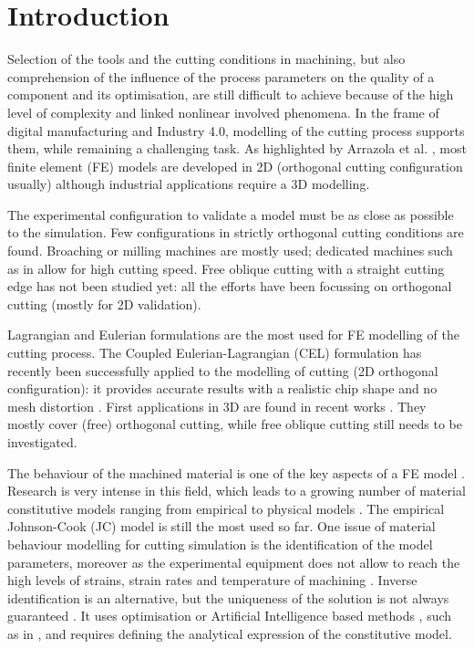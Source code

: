 \documentclass[final,5p,times,twocolumn]{elsarticle}
\begin{document}
\section{Introduction}
\label{Intro}

Selection of the tools and the cutting conditions in machining, but also comprehension of the influence of the process parameters on the quality of a component and its optimisation, are still difficult to achieve because of the high level of complexity and linked nonlinear involved phenomena. In the frame of digital manufacturing and Industry 4.0, modelling of the cutting process supports them, while remaining a challenging task. As highlighted by Arrazola et al. \cite{arrazola_recent_2013}, most finite element (FE) models are developed in 2D (orthogonal cutting configuration usually) although industrial applications require a 3D modelling.

The experimental configuration to validate a model must be as close as possible to the simulation. Few configurations in strictly orthogonal cutting conditions are found. Broaching \cite{abouridouane_friction_2021} or milling \cite{sela_measurement_2021, ducobu_experimental_2015} machines are mostly used; dedicated machines such as in \cite{afrasiabi_numerical-experimental_2021} allow for high cutting speed. Free oblique cutting with a straight cutting edge has not been studied yet: all the efforts have been focussing on orthogonal cutting (mostly for 2D validation).

Lagrangian and Eulerian formulations are the most used for FE modelling of the cutting process. The Coupled Eulerian-Lagrangian (CEL) formulation has recently been successfully applied to the modelling of cutting (2D orthogonal configuration): it provides accurate results with a realistic chip shape and no mesh distortion \cite{ducobu_application_2016}. First applications in 3D are found in recent works \cite{xu_simulation_2021, ducobu_finite_2017, ambrosio_new_2022, vovk_finite_2020, hardt_three_2021}. They mostly cover (free) orthogonal cutting, while free oblique cutting still needs to be investigated.

The behaviour of the machined material is one of the key aspects of a FE model \cite{arrazola_recent_2013, melkote_advances_2017}. Research is very intense in this field, which leads to a growing number of material constitutive models ranging from empirical to physical models \cite{melkote_advances_2017}. The empirical Johnson-Cook (JC) model \cite{johnson_constitutive_1983} is still the most used so far. One issue of material behaviour modelling for cutting simulation is the identification of the model parameters, moreover as the experimental equipment does not allow to reach the high levels of strains, strain rates and temperature of machining \cite{melkote_advances_2017}. Inverse identification is an alternative, but the uniqueness of the solution is not always guaranteed \cite{arrazola_recent_2013}. It uses optimisation or Artificial Intelligence based methods \cite{melkote_advances_2017}, such as in \cite{hardt_investigations_2021}, and requires defining the analytical expression of the constitutive model.
\end{document}
